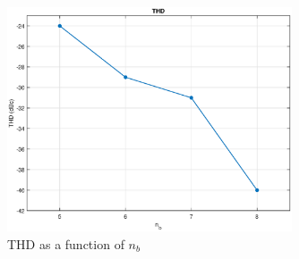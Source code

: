 \begin{figure}[htbp]
	\center
	\includegraphics[width=0.75\textwidth]{./chapter1/images/thdplot.eps}
	\caption{THD as a function of $n_b$}
	\label{fig:thdplot}
\end{figure}

